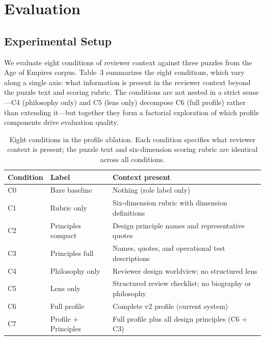 \section{Evaluation}
\label{sec:evaluation}

\subsection{Experimental Setup}

We evaluate eight conditions of reviewer context against three puzzles from the Age of Empires corpus. Table~3 summarizes the eight conditions, which vary along a single axis: what information is present in the reviewer context beyond the puzzle text and scoring rubric. The conditions are not nested in a strict sense---C4 (philosophy only) and C5 (lens only) decompose C6 (full profile) rather than extending it---but together they form a factorial exploration of which profile components drive evaluation quality.

\begin{table}[h]
\centering
\caption{Eight conditions in the profile ablation. Each condition specifies what reviewer context is present; the puzzle text and six-dimension scoring rubric are identical across all conditions.}
\begin{tabular}{llp{6cm}}
\toprule
Condition & Label & Context present \\
\midrule
C0 & Bare baseline & Nothing (role label only) \\
C1 & Rubric only & Six-dimension rubric with dimension definitions \\
C2 & Principles compact & Design principle names and representative quotes \\
C3 & Principles full & Names, quotes, and operational test descriptions \\
C4 & Philosophy only & Reviewer design worldview; no structured lens \\
C5 & Lens only & Structured review checklist; no biography or philosophy \\
C6 & Full profile & Complete v2 profile (current system) \\
C7 & Profile + Principles & Full profile plus all design principles (C6 + C3) \\
\bottomrule
\end{tabular}
\label{tab:conditions}
\end{table}

